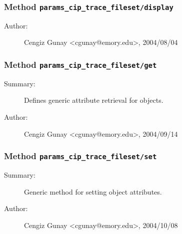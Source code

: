 \subsubsection[Method \texttt{display}]{Method \texttt{params\_cip\_trace\_fileset/display}}%
%
\label{ref_params_cip_trace_fileset__display}%
\hypertarget{ref_params_cip_trace_fileset__display}{}%
\begin{description}
%
%
%
%
%
%
%
\item[Author:]%
Cengiz Gunay <cgunay@emory.edu>, 2004/08/04%
\end{description}
\methodline%
\subsubsection[Method \texttt{get}]{Method \texttt{params\_cip\_trace\_fileset/get}}%
%
\label{ref_params_cip_trace_fileset__get}%
\hypertarget{ref_params_cip_trace_fileset__get}{}%
\begin{description}
\item[Summary:]Defines generic attribute retrieval for objects.
%
%
%
%
%
%
%
\item[Author:]%
Cengiz Gunay <cgunay@emory.edu>, 2004/09/14%
\end{description}
\methodline%
\subsubsection[Method \texttt{set}]{Method \texttt{params\_cip\_trace\_fileset/set}}%
%
\label{ref_params_cip_trace_fileset__set}%
\hypertarget{ref_params_cip_trace_fileset__set}{}%
\begin{description}
\item[Summary:]Generic method for setting object attributes.
%
%
%
%
%
%
%
\item[Author:]%
Cengiz Gunay <cgunay@emory.edu>, 2004/10/08%
\end{description}
\methodline%
